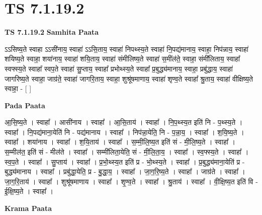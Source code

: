 \documentclass[17pt]{extarticle}
\begin{document}
\section{ TS 7.1.19.2 }

\textbf{TS 7.1.19.2 } \newline
\textbf{Samhita Paata} \newline

ऽऽसिष्य॒ते स्वाहा ऽऽसी॑नाय॒ स्वाहा॑ ऽऽसि॒ताय॒ स्वाहा॑ निपथ्स्य॒ते स्वाहा॑ नि॒पद्य॑मानाय॒ स्वाहा॒ निप॑न्नाय॒ स्वाहा॑ शयिष्य॒ते स्वाहा॒ शया॑नाय॒ स्वाहा॑ शयि॒ताय॒ स्वाहा॑ संमीलिष्य॒ते स्वाहा॑ स॒मींल॑ते॒ स्वाहा॒ संमी॑लिताय॒ स्वाहा᳚ स्वफ्स्य॒ते स्वाहा᳚ स्वप॒ते स्वाहा॑ सु॒प्ताय॒ स्वाहा᳚ प्रभोथ्स्य॒ते स्वाहा᳚ प्र॒बुद्ध्य॑मानाय॒ स्वाहा॒ प्रबु॑द्धाय॒ स्वाहा॑ जागरिष्य॒ते स्वाहा॒ जाग्र॑ते॒ स्वाहा॑ जागरि॒ताय॒ स्वाहा॒ शुश्रू॑षमाणाय॒ स्वाहा॑ शृण्व॒ते स्वाहा᳚ श्रु॒ताय॒ स्वाहा॑ वीक्षिष्य॒ते स्वाहा॒ - [  ] \newline

\textbf{Pada Paata} \newline

आ॒सि॒ष्य॒ते । स्वाहा᳚ । आसी॑नाय । स्वाहा᳚ । आ॒सि॒ताय॑ । स्वाहा᳚ । नि॒प॒थ्स्य॒त इति॑ नि - प॒थ्स्य॒ते । स्वाहा᳚ । नि॒पद्य॑माना॒येति॑ नि - पद्य॑मानाय । स्वाहा᳚ । निप॑न्ना॒येति॒ नि - प॒न्ना॒य॒ । स्वाहा᳚ । श॒यि॒ष्य॒ते । स्वाहा᳚ । शया॑नाय । स्वाहा᳚ । श॒यि॒ताय॑ । स्वाहा᳚ । स॒म्मी॒लि॒ष्य॒त इति॑ सं - मी॒लि॒ष्य॒ते । स्वाहा᳚ । स॒म्मील॑त॒ इति॑ सं - मील॑ते । स्वाहा᳚ । सम्मी॑लिता॒येति॒ सं - मी॒लि॒ता॒य॒ । स्वाहा᳚ । स्व॒फ्स्य॒ते । स्वाहा᳚ । स्व॒प॒ते । स्वाहा᳚ । सु॒प्ताय॑ । स्वाहा᳚ । प्र॒भो॒थ्स्य॒त इति॑ प्र - भो॒थ्स्य॒ते । स्वाहा᳚ । प्र॒बुद्ध्य॑माना॒येति॑ प्र - बुद्ध्य॑मानाय । स्वाहा᳚ । प्रबु॑द्धा॒येति॒ प्र - बु॒द्धा॒य॒ । स्वाहा᳚ । जा॒ग॒रि॒ष्य॒ते । स्वाहा᳚ । जाग्र॑ते । स्वाहा᳚ । जा॒ग॒रि॒ताय॑ । स्वाहा᳚ । शुश्रू॑षमाणाय । स्वाहा᳚ । शृ॒ण्व॒ते । स्वाहा᳚ । श्रु॒ताय॑ । स्वाहा᳚ । वी॒क्षि॒ष्य॒त इति॑ वि - ई॒क्षि॒ष्य॒ते । स्वाहा᳚ ।  \newline


\textbf{Krama Paata} \newline
\end{document}
